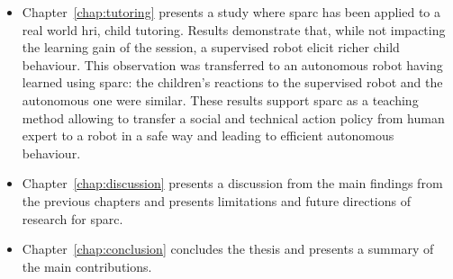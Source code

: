 \begin{itemize}
	\item Chapter~\ref{chap:tutoring} presents a study where \gls{sparc} has been applied to a real world \gls{hri}, child tutoring. Results demonstrate that,	 while not impacting the learning gain of the session, a supervised robot elicit richer child behaviour. This observation was transferred to an autonomous robot having learned using \gls{sparc}: the children's reactions to the supervised robot and the autonomous one were similar. These results support \gls{sparc} as a teaching method allowing to transfer a social and technical action policy from human expert to a robot in a safe way and leading to efficient autonomous behaviour.
	
	\item Chapter~\ref{chap:discussion} presents a discussion from the main findings from the previous chapters and presents limitations and future directions of research for \gls{sparc}.
	
	\item Chapter~\ref{chap:conclusion} concludes the thesis and presents a summary of the main contributions.
	
\end{itemize}
